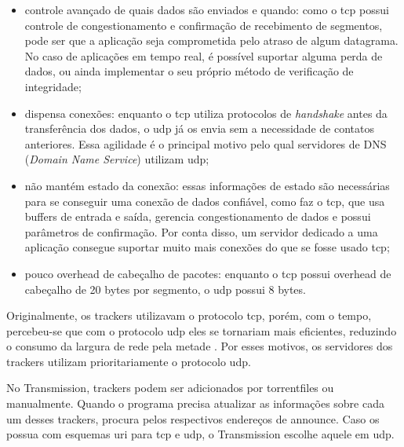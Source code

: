 \begin{itemize}
    \item controle avançado de quais dados são enviados e quando: como o \gls*{tcp}
        possui controle de congestionamento e confirmação de recebimento de segmentos,
        pode ser que a aplicação seja comprometida pelo atraso de algum datagrama. No
        caso de aplicações em tempo real, é possível suportar alguma perda de dados, ou
        ainda implementar o seu próprio método de verificação de integridade;

    \item dispensa conexões: enquanto o \gls*{tcp} utiliza protocolos de
        \emph{handshake} antes da transferência dos dados, o \gls*{udp} já os envia sem
        a necessidade de contatos anteriores. Essa agilidade é o principal motivo pelo
        qual servidores de DNS (\emph{Domain Name Service}) utilizam \gls*{udp};

    \item não mantém estado da conexão: essas informações de estado são necessárias para
        se conseguir uma conexão de dados confiável, como faz o \gls*{tcp}, que usa
        buffers de entrada e saída, gerencia congestionamento de dados e possui
        parâmetros de confirmação. Por conta disso, um servidor dedicado a uma
        aplicação consegue suportar muito mais conexões do que se fosse usado
        \gls*{tcp};

    \item pouco \gls{overhead} de cabeçalho de pacotes: enquanto o \gls*{tcp} possui
        \gls*{overhead} de cabeçalho de 20 bytes por segmento, o \gls*{udp} possui 8
        bytes.
\end{itemize}

Originalmente, os \glspl*{tracker} utilizavam o protocolo \gls*{tcp}, porém, com o
tempo, percebeu-se que com o protocolo \gls*{udp} eles se tornariam mais eficientes,
reduzindo o consumo da largura de rede pela metade \cite{site:tracker-udp}. Por esses
motivos, os servidores dos \glspl*{tracker} utilizam prioritariamente o protocolo
\gls*{udp}.

No Transmission, \glspl*{tracker} podem ser adicionados por \glspl*{torrentfile} ou
manualmente. Quando o programa precisa atualizar as informações sobre cada um desses
\glspl*{tracker}, procura pelos respectivos endereços de \gls{announce}. Caso os possua
com esquemas \gls{uri} para \gls*{tcp} e \gls*{udp}, o Transmission escolhe aquele em
\gls*{udp}.


